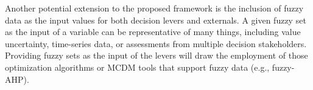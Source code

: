 \documentclass{sfuthesis}
\begin{document}
Another potential extension to the proposed framework is the inclusion of fuzzy data as the input values for both decision levers and externals. A given fuzzy set as the input of a variable can be representative of many things, including value uncertainty, time-series data, or assessments from multiple decision stakeholders. Providing fuzzy sets as the input of the levers will draw the employment of those optimization algorithms or MCDM tools that support fuzzy data (e.g., fuzzy-AHP).





%
%
%
%
%

\backmatter%
    
    
\end{document}
